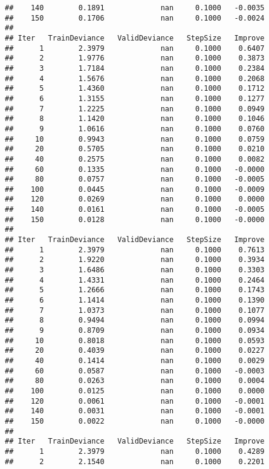 \documentclass[]{article}
\begin{document}
\begin{verbatim}
##    140        0.1891             nan     0.1000   -0.0035
##    150        0.1706             nan     0.1000   -0.0024
## 
## Iter   TrainDeviance   ValidDeviance   StepSize   Improve
##      1        2.3979             nan     0.1000    0.6407
##      2        1.9776             nan     0.1000    0.3873
##      3        1.7184             nan     0.1000    0.2384
##      4        1.5676             nan     0.1000    0.2068
##      5        1.4360             nan     0.1000    0.1712
##      6        1.3155             nan     0.1000    0.1277
##      7        1.2225             nan     0.1000    0.0949
##      8        1.1420             nan     0.1000    0.1046
##      9        1.0616             nan     0.1000    0.0760
##     10        0.9943             nan     0.1000    0.0759
##     20        0.5705             nan     0.1000    0.0210
##     40        0.2575             nan     0.1000    0.0082
##     60        0.1335             nan     0.1000   -0.0000
##     80        0.0757             nan     0.1000   -0.0005
##    100        0.0445             nan     0.1000   -0.0009
##    120        0.0269             nan     0.1000    0.0000
##    140        0.0161             nan     0.1000   -0.0005
##    150        0.0128             nan     0.1000   -0.0000
## 
## Iter   TrainDeviance   ValidDeviance   StepSize   Improve
##      1        2.3979             nan     0.1000    0.7613
##      2        1.9220             nan     0.1000    0.3934
##      3        1.6486             nan     0.1000    0.3303
##      4        1.4331             nan     0.1000    0.2464
##      5        1.2666             nan     0.1000    0.1743
##      6        1.1414             nan     0.1000    0.1390
##      7        1.0373             nan     0.1000    0.1077
##      8        0.9494             nan     0.1000    0.0994
##      9        0.8709             nan     0.1000    0.0934
##     10        0.8018             nan     0.1000    0.0593
##     20        0.4039             nan     0.1000    0.0227
##     40        0.1414             nan     0.1000    0.0029
##     60        0.0587             nan     0.1000   -0.0003
##     80        0.0263             nan     0.1000    0.0004
##    100        0.0125             nan     0.1000    0.0000
##    120        0.0061             nan     0.1000   -0.0001
##    140        0.0031             nan     0.1000   -0.0001
##    150        0.0022             nan     0.1000   -0.0000
## 
## Iter   TrainDeviance   ValidDeviance   StepSize   Improve
##      1        2.3979             nan     0.1000    0.4289
##      2        2.1540             nan     0.1000    0.2201

\end{verbatim}
\end{document}
